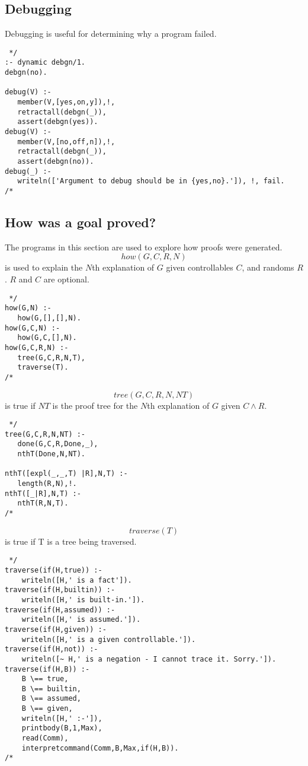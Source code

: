 \documentclass[11pt,fleqn]{article}
\begin{document}
\subsection{Debugging}
Debugging is useful for determining why a program failed.
\begin{verbatim} */
:- dynamic debgn/1.
debgn(no).

debug(V) :-
   member(V,[yes,on,y]),!,
   retractall(debgn(_)),
   assert(debgn(yes)).
debug(V) :-
   member(V,[no,off,n]),!,
   retractall(debgn(_)),
   assert(debgn(no)).
debug(_) :-
   writeln(['Argument to debug should be in {yes,no}.']), !, fail.
/* \end{verbatim}

\subsection{How was a goal proved?}
The programs in this section are used to explore how proofs were generated.
\[how(G,C,R,N)\]
is used to explain the $N$th explanation of $G$ given controllables
$C$, and randoms $R$. $R$ and $C$ are optional.

\begin{verbatim} */
how(G,N) :-
   how(G,[],[],N).
how(G,C,N) :-
   how(G,C,[],N).
how(G,C,R,N) :-
   tree(G,C,R,N,T),
   traverse(T).
/* \end{verbatim}

\[tree(G,C,R,N,NT)\]
is true if $NT$ is the proof tree for the $N$th explanation of $G$ given $C\wedge R$.

\begin{verbatim} */
tree(G,C,R,N,NT) :-
   done(G,C,R,Done,_),
   nthT(Done,N,NT).

nthT([expl(_,_,T) |R],N,T) :-
   length(R,N),!.
nthT([_|R],N,T) :-
   nthT(R,N,T).
/* \end{verbatim}

\[traverse(T)\] 
is true if T is a tree being traversed.
\begin{verbatim} */
traverse(if(H,true)) :-
    writeln([H,' is a fact']).
traverse(if(H,builtin)) :-
    writeln([H,' is built-in.']).
traverse(if(H,assumed)) :-
    writeln([H,' is assumed.']).
traverse(if(H,given)) :-
    writeln([H,' is a given controllable.']).
traverse(if(H,not)) :-
    writeln([~ H,' is a negation - I cannot trace it. Sorry.']).
traverse(if(H,B)) :-
    B \== true,
    B \== builtin,
    B \== assumed,
    B \== given,
    writeln([H,' :-']),
    printbody(B,1,Max),
    read(Comm),
    interpretcommand(Comm,B,Max,if(H,B)).
/* \end{verbatim}
\end{document}

